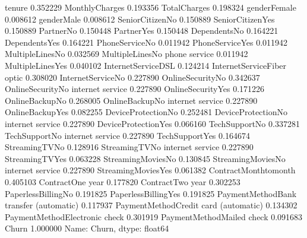\documentclass[letterpaper,10pt,english]{jupyterBook}
\begin{document}
\begin{sphinxVerbatim}[commandchars=\\\{\}]
tenure                                    \PYGZhy{}0.352229
MonthlyCharges                             0.193356
TotalCharges                              \PYGZhy{}0.198324
gender\PYGZus{}Female                              0.008612
gender\PYGZus{}Male                               \PYGZhy{}0.008612
SeniorCitizen\PYGZus{}No                          \PYGZhy{}0.150889
SeniorCitizen\PYGZus{}Yes                          0.150889
Partner\PYGZus{}No                                 0.150448
Partner\PYGZus{}Yes                               \PYGZhy{}0.150448
Dependents\PYGZus{}No                              0.164221
Dependents\PYGZus{}Yes                            \PYGZhy{}0.164221
PhoneService\PYGZus{}No                           \PYGZhy{}0.011942
PhoneService\PYGZus{}Yes                           0.011942
MultipleLines\PYGZus{}No                          \PYGZhy{}0.032569
MultipleLines\PYGZus{}No phone service            \PYGZhy{}0.011942
MultipleLines\PYGZus{}Yes                          0.040102
InternetService\PYGZus{}DSL                       \PYGZhy{}0.124214
InternetService\PYGZus{}Fiber optic                0.308020
InternetService\PYGZus{}No                        \PYGZhy{}0.227890
OnlineSecurity\PYGZus{}No                          0.342637
OnlineSecurity\PYGZus{}No internet service        \PYGZhy{}0.227890
OnlineSecurity\PYGZus{}Yes                        \PYGZhy{}0.171226
OnlineBackup\PYGZus{}No                            0.268005
OnlineBackup\PYGZus{}No internet service          \PYGZhy{}0.227890
OnlineBackup\PYGZus{}Yes                          \PYGZhy{}0.082255
DeviceProtection\PYGZus{}No                        0.252481
DeviceProtection\PYGZus{}No internet service      \PYGZhy{}0.227890
DeviceProtection\PYGZus{}Yes                      \PYGZhy{}0.066160
TechSupport\PYGZus{}No                             0.337281
TechSupport\PYGZus{}No internet service           \PYGZhy{}0.227890
TechSupport\PYGZus{}Yes                           \PYGZhy{}0.164674
StreamingTV\PYGZus{}No                             0.128916
StreamingTV\PYGZus{}No internet service           \PYGZhy{}0.227890
StreamingTV\PYGZus{}Yes                            0.063228
StreamingMovies\PYGZus{}No                         0.130845
StreamingMovies\PYGZus{}No internet service       \PYGZhy{}0.227890
StreamingMovies\PYGZus{}Yes                        0.061382
Contract\PYGZus{}Month\PYGZhy{}to\PYGZhy{}month                    0.405103
Contract\PYGZus{}One year                         \PYGZhy{}0.177820
Contract\PYGZus{}Two year                         \PYGZhy{}0.302253
PaperlessBilling\PYGZus{}No                       \PYGZhy{}0.191825
PaperlessBilling\PYGZus{}Yes                       0.191825
PaymentMethod\PYGZus{}Bank transfer (automatic)   \PYGZhy{}0.117937
PaymentMethod\PYGZus{}Credit card (automatic)     \PYGZhy{}0.134302
PaymentMethod\PYGZus{}Electronic check             0.301919
PaymentMethod\PYGZus{}Mailed check                \PYGZhy{}0.091683
Churn                                      1.000000
Name: Churn, dtype: float64
\end{sphinxVerbatim}
\end{document}
